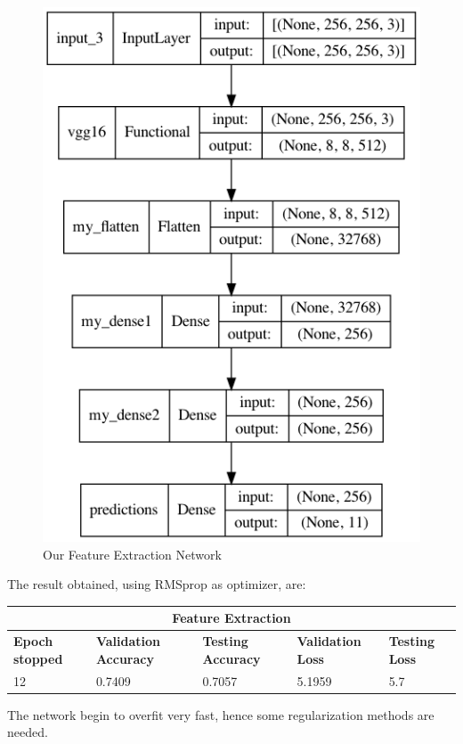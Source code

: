 \begin{figure}[H]
	\centering
	\includegraphics[height=0.5\textwidth]{img/vgg16/vgg16fe1.png}
	\caption{Our Feature Extraction Network}
	\label{fig:vgg16fe1}
\end{figure}


\noindent The result obtained, using RMSprop as optimizer, are:

\medskip

\begin{tabular}{ |p{2cm}|p{2cm}|p{2cm}|p{2cm}|p{2cm}|  }
\hline
\multicolumn{5}{|c|}{Feature Extraction} \\
\hline
\textbf{Epoch stopped} & \textbf{Validation Accuracy} & \textbf{Testing Accuracy} & \textbf{Validation Loss} & \textbf{Testing Loss} \\
\hline
12 & 0.7409 & 0.7057 & 5.1959 & 5.7\\
\hline
\end{tabular}

\medskip

 \noindent The network begin to overfit very fast, hence some regularization methods are needed.


